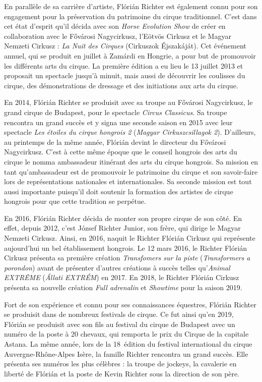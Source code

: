 En parallèle de sa carrière d’artiste, Flórián Richter est également connu pour son engagement pour la préservation du patrimoine du cirque traditionnel. C’est dans cet état d’esprit qu’il décida avec son \textit{Horse Evolution Show} de créer en collaboration avec le Fővárosi Nagycirkusz, l'Eötvös Cirkusz et le Magyar Nemzeti Cirkusz : \textit{La Nuit des Cirques} (Cirkuszok Éjszakáját). Cet événement annuel, qui se produit en juillet à Zamárdi en Hongrie, a pour but de promouvoir les différents arts du cirque. La première édition a eu lieu le 13 juillet 2013 et proposait un spectacle jusqu’à minuit, mais aussi de découvrir les coulisses du cirque, des démonstrations de dressage et des initiations aux arts du cirque. 

En 2014, Flórián Richter se produisit avec sa troupe au Fővárosi Nagycirkusz, le grand cirque de Budapest, pour le spectacle \textit{Circus Classicus}. Sa troupe rencontra un grand succès et y signa une seconde saison en 2015 avec leur spectacle \textit{Les étoiles du cirque hongrois 2} (\textit{Magyar Cirkuszcsillagok 2}). D’ailleurs, au printemps de la même année, Flórián devint le directeur du Fővárosi Nagycirkusz. C’est à cette même époque que le conseil hongrois des arts du cirque le nomma ambassadeur itinérant des arts du cirque hongrois. Sa mission en tant qu’ambassadeur est de promouvoir le patrimoine du cirque et son savoir-faire lors de représentations nationales et internationales. Sa seconde mission est tout aussi importante puisqu’il doit soutenir la formation des artistes de cirque hongrois pour que cette tradition se perpétue.

En 2016, Flórián Richter décida de monter son propre cirque de son côté. En effet, depuis 2012, c’est József Richter Junior, son frère, qui dirige le Magyar Nemzeti Cirkusz. Ainsi, en 2016, naquit le Richter Flórián Cirkusz qui représente aujourd’hui un bel établissement hongrois. Le 12 mars 2016, le Richter Flórián Cirkusz présenta sa première création \textit{Transfomers sur la piste }(\textit{Transformers a porondon}) avant de présenter d’autres créations à succès telles qu’\textit{Animal EXTRÊME} (\textit{Állati EXTRÉM}) en 2017. En 2018, le Richter Flórián Cirkusz présenta sa nouvelle création \textit{Full adrenalin} et \textit{Showtime} pour la saison 2019. 

Fort de son expérience et connu pour ses connaissances équestres, Flórián Richter se produisit dans de nombreux festivals de cirque. Ce fut ainsi qu'en 2019, Flórián se produisit avec son fils au festival du cirque de Budapest avec un numéro de la poste à 20 chevaux, qui remporta le prix du Cirque de la capitale Astana. La même année, lors de la 18\ieme~édition du festival international du cirque Auvergne-Rhône-Alpes Isère, la famille Richter rencontra un grand succès. Elle présenta ses numéros les plus célèbres : la troupe de jockeys, la cavalerie en liberté de Flórián et la poste de Kevin Richter sous la direction de son père.

